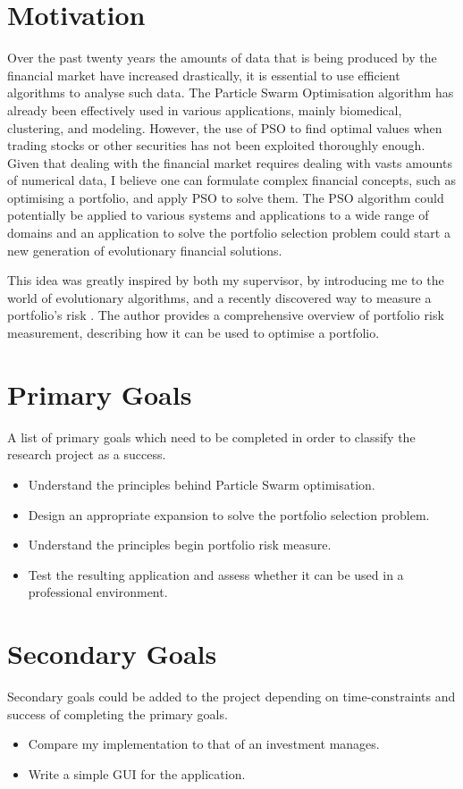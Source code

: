   \section{Motivation} %
  \label{sec:motivation}
  Over the past twenty years the amounts of data that is being produced by the financial market have increased drastically, it is essential to use efficient algorithms to analyse such data. The Particle Swarm Optimisation algorithm has already been effectively used in various applications, mainly  biomedical, clustering, and modeling. However, the use of PSO to find optimal values when trading stocks or other securities has not been exploited thoroughly enough. Given that dealing with the financial market requires dealing with vasts amounts of numerical data, I believe one can formulate complex financial concepts, such as optimising a portfolio, and apply PSO to solve them. The PSO algorithm could potentially be applied to various systems and applications to a wide range of domains and an application to solve the portfolio selection problem could start a new generation of evolutionary financial solutions. 
  
  This idea was greatly inspired by both my supervisor, by introducing me to the world of evolutionary algorithms, and a recently discovered way to measure a portfolio's risk \cite{two_sided_risk}. The author provides a comprehensive overview of portfolio risk measurement, describing how it can be used to optimise a portfolio.

  \section{Primary Goals} %
  \label{sec:primary_goals}
  A list of primary goals which need to be completed in order to classify the research project as a success.
  \begin{itemize}
    \item Understand the principles behind Particle Swarm optimisation.
    \item Design an appropriate expansion to solve the portfolio selection problem.
    \item Understand the principles begin portfolio risk measure.
    \item Test the resulting application and assess whether it can be used in a professional environment.
  \end{itemize}

  \section{Secondary Goals} %
  \label{sec:secondary_goals}
  Secondary goals could be added to the project depending on time-constraints and success of completing the primary goals.
  \begin{itemize}
    \item Compare my implementation to that of an investment manages. 
    \item Write a simple GUI for the application.
  \end{itemize}
